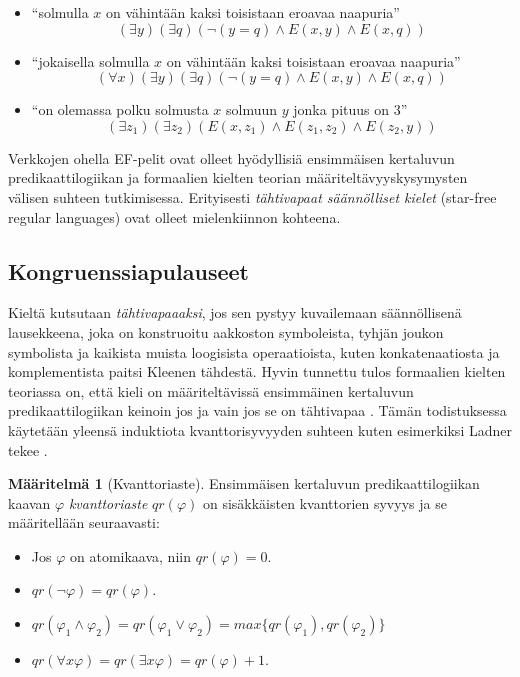 \documentclass[finnish]{tktltiki2}
\theoremstyle{definition}
\newtheorem{maar}[lau]{Määritelmä}
\theoremstyle{remark}
\begin{document}
\begin{itemize}
\item ``solmulla $x$ on vähintään kaksi toisistaan eroavaa naapuria'' \[(\exists y)(\exists q)(\neg(y = q) \land E(x, y) \land E(x, q))\]
\item ``jokaisella solmulla $x$ on vähintään kaksi toisistaan eroavaa naapuria'' \[(\forall x)(\exists y)(\exists q)(\neg(y = q)\land E(x, y) \land E(x, q))\]
\item ``on olemassa polku solmusta $x$ solmuun $y$ jonka pituus on $3$'' \[(\exists z_1)(\exists z_2)(E(x, z_1)\land E(z_1, z_2) \land E(z_2, y))\]
\end{itemize}

Verkkojen ohella EF-pelit ovat olleet hyödyllisiä ensimmäisen kertaluvun predikaattilogiikan ja formaalien kielten teorian määriteltävyyskysymysten välisen suhteen tutkimisessa. Erityisesti \textit{tähtivapaat säännölliset kielet} (star-free regular languages) ovat olleet mielenkiinnon kohteena.

\subsection{Kongruenssiapulauseet}
Kieltä kutsutaan \textit{tähtivapaaaksi}, jos sen pystyy kuvailemaan säännöllisenä lausekkeena, joka on konstruoitu aakkoston symboleista, tyhjän joukon symbolista ja kaikista muista loogisista operaatioista, kuten konkatenaatiosta ja komplementista paitsi Kleenen tähdestä. Hyvin tunnettu tulos formaalien kielten teoriassa on, että kieli on määriteltävissä ensimmäinen kertaluvun predikaattilogiikan keinoin jos ja vain jos se on tähtivapaa \cite{McN71}. Tämän todistuksessa käytetään yleensä induktiota kvanttorisyvyyden suhteen kuten esimerkiksi Ladner tekee \cite{Lad77}.

\begin{maar}[Kvanttoriaste]
Ensimmäisen kertaluvun predikaattilogiikan kaavan $\varphi$ \textit{kvanttoriaste} $qr(\varphi)$ on sisäkkäisten kvanttorien syvyys ja se määritellään seuraavasti:
\begin{itemize}
\item Jos $\varphi$ on atomikaava, niin $qr(\varphi) = 0$.
\item $qr(\neg \varphi) = qr(\varphi)$.
\item $qr(\varphi_1 \land \varphi_2) = qr(\varphi_1 \lor \varphi_2) = max\{qr(\varphi_1), qr(\varphi_2)\}$
\item $qr(\forall x \varphi) = qr(\exists x \varphi) = qr(\varphi) + 1$.
\end{itemize}
\end{maar}
\end{document}
